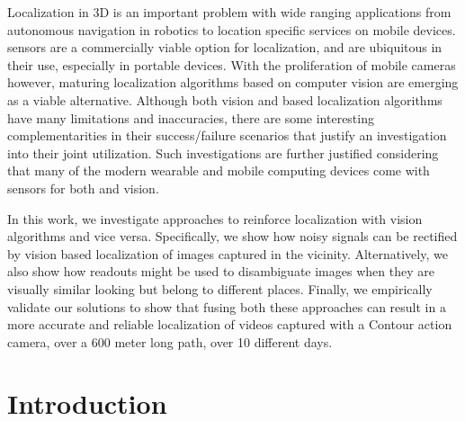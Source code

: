 	Localization in 3D is an important problem with wide ranging applications from autonomous 
	navigation in robotics to location specific services on mobile devices.
	  \gps sensors are a commercially viable option for localization, and are ubiquitous in their
	  use, especially in portable devices. With the proliferation of mobile cameras however,
	  maturing localization algorithms based on computer vision are emerging as a viable alternative.
	  Although both vision and \gps based localization algorithms have many limitations and inaccuracies,
	  there are some interesting complementarities in their success/failure scenarios that justify
	  an investigation into their joint utilization. Such investigations are further
	  justified considering that many of the modern wearable and mobile computing devices come with sensors for both \gps and vision.
	
	  In this work, we investigate approaches to reinforce \gps localization with vision algorithms and
	  vice versa. Specifically, we show how noisy \gps signals can be rectified by vision based
	  localization of images captured in the vicinity. Alternatively, we also show how 
	  \gps readouts might be used to disambiguate images when they are visually similar looking
	  but belong to different places. Finally, we empirically validate our solutions to show that
	  fusing both these approaches can result in a more accurate and reliable localization of videos
	  captured with a Contour action camera, over a 600 meter long path, over 10 different days.

\section{Introduction}

